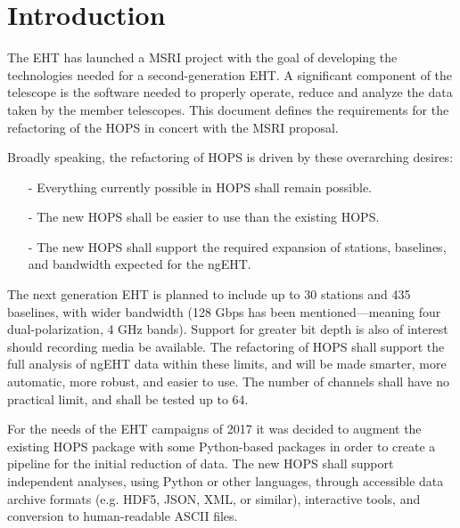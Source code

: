 %
%

\section{Introduction}
\label{sec:intro}

The \ac{EHT} has launched a \ac{MSRI} project with the goal of developing
the technologies needed for a second-generation \acs{EHT}. 
A significant component of the telescope is the software needed to 
properly operate, reduce and analyze the data taken by the member telescopes.
This document defines the requirements for the refactoring of the \ac{HOPS} in 
concert with the \acs{MSRI} proposal. 

Broadly speaking, the refactoring of \acs{HOPS} is driven by
these overarching desires:

\begin{itemize}
\item[-] Everything currently possible in \ac{HOPS} shall remain possible.

\item[-] The new \ac{HOPS} shall be easier to use than the existing \acs{HOPS}.
 
\item[-] The new \acs{HOPS} shall support the required expansion of stations, 
baselines, and bandwidth expected for the ngEHT.

\end{itemize}

The next generation \acs{EHT} is planned to include up to 30 stations
and 435 baselines, with wider bandwidth (128 Gbps has been mentioned---meaning
four dual-polarization, 4 GHz bands). Support for greater bit depth is
also of interest should recording media be available.  The refactoring
of \ac{HOPS} shall support the full analysis of ngEHT data within these limits,
and will be made smarter, more automatic, more robust, and easier to use. The
number of channels shall have no practical limit, and shall be tested up to 64.


For the needs of the \acs{EHT} campaigns of 2017 it was decided to augment
the existing HOPS package with some Python-based packages in order to
create a pipeline for the initial reduction of data.
The new \ac{HOPS} shall
support independent analyses, using Python or other languages, through
accessible data archive formats (e.g. HDF5, JSON, XML, or similar), interactive 
tools, and conversion to human-readable ASCII files. 

